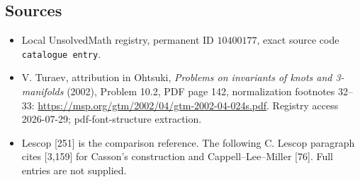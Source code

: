 \documentclass[11pt]{article}
\begin{document}
\subsection{Sources}
\begin{itemize}
\item Local UnsolvedMath registry, permanent ID \(10400177\), exact source code \texttt{catalogue entry}.
\item V. Turaev, attribution in Ohtsuki, \emph{Problems on invariants of knots and 3-manifolds} (2002), Problem 10.2, PDF page 142, normalization footnotes 32--33: \url{https://msp.org/gtm/2002/04/gtm-2002-04-024s.pdf}. Registry access 2026-07-29; pdf-font-structure extraction.
\item Lescop [251] is the comparison reference. The following C. Lescop paragraph cites [3,159] for Casson's construction and Cappell--Lee--Miller [76]. Full entries are not supplied.
\end{itemize}
\end{document}
